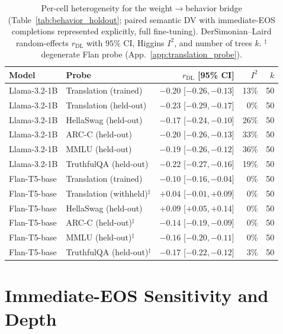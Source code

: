 \documentclass{article}
\theoremstyle{definition}
\theoremstyle{plain}
\begin{document}
\begin{table}[h]
\caption{Per-cell heterogeneity for the weight$\to$behavior bridge (Table~\ref{tab:behavior_holdout};
  paired semantic DV with immediate-EOS completions represented explicitly, full fine-tuning).
  DerSimonian--Laird random-effects $r_{\mathrm{DL}}$ with $95\%$ CI, Higgins $I^2$,
  and number of trees $k$. $^\ddagger$degenerate Flan probe (App.~\ref{app:translation_probe}).}
\label{tab:behavior_het}
\begin{center}
\small
\begin{tabular}{llrrr}
\toprule
Model & Probe & $r_{\mathrm{DL}}$ [95\% CI] & $I^2$ & $k$ \\
\midrule
Llama-3.2-1B & Translation (trained)              & $-0.20$ [$-0.26,-0.13$] & 13\% & 50 \\
Llama-3.2-1B & Translation (held-out)             & $-0.23$ [$-0.29,-0.17$] & 0\% & 50 \\
Llama-3.2-1B & HellaSwag (held-out)               & $-0.17$ [$-0.24,-0.10$] & 26\% & 50 \\
Llama-3.2-1B & ARC-C (held-out)                   & $-0.20$ [$-0.26,-0.13$] & 33\% & 50 \\
Llama-3.2-1B & MMLU (held-out)                    & $-0.19$ [$-0.26,-0.12$] & 36\% & 50 \\
Llama-3.2-1B & TruthfulQA (held-out)              & $-0.22$ [$-0.27,-0.16$] & 19\% & 50 \\
Flan-T5-base & Translation (trained)              & $-0.10$ [$-0.16,-0.04$] & 0\% & 50 \\
Flan-T5-base & Translation (withheld)$^\ddagger$ & $+0.04$ [$-0.01,+0.09$] & 0\% & 50 \\
Flan-T5-base & HellaSwag (held-out)               & $+0.09$ [$+0.05,+0.14$] & 0\% & 50 \\
Flan-T5-base & ARC-C (held-out)$^\ddagger$         & $-0.14$ [$-0.19,-0.09$] & 0\% & 50 \\
Flan-T5-base & MMLU (held-out)$^\ddagger$          & $-0.16$ [$-0.20,-0.11$] & 0\% & 50 \\
Flan-T5-base & TruthfulQA (held-out)$^\ddagger$    & $-0.17$ [$-0.22,-0.12$] & 3\% & 50 \\
\bottomrule
\end{tabular}
\end{center}
\end{table}


\section{Immediate-EOS Sensitivity and Depth}
\label{app:empty-sensitivity}
\end{document}
